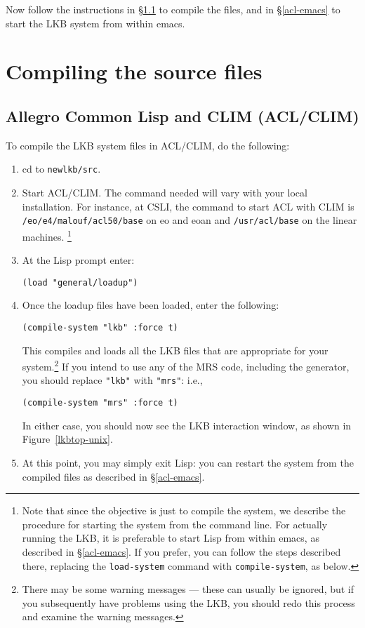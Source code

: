 \documentclass[12pt]{report}
\newcommand{\filename}[1]{{\tt #1}}
\newcommand{\functionname}[1]{{\tt #1}}
\begin{document}
Now follow the instructions in \S\ref{acl-src} to compile the
files, and in \S\ref{acl-emacs} to start the LKB system from within
emacs.


\section{Compiling the source files}
\label{src}

\subsection{Allegro Common Lisp and CLIM (ACL/CLIM)}
\label{acl-src}

To compile the LKB system files in ACL/CLIM, do the following:
\begin{enumerate}
\item cd to \filename{newlkb/src}.  
\item Start ACL/CLIM.  The command needed will vary with your local
installation.  For instance,
at CSLI, the command to start ACL with CLIM is \filename{/eo/e4/malouf/acl50/base} on eo and eoan and
\filename{/usr/acl/base} on the linear machines.
\footnote{Note that since the objective is just to compile the system,
we describe the procedure for
starting the system from the command line.  For actually running the LKB,
it is preferable to start Lisp from within emacs, as described
in \S\ref{acl-emacs}.  If you prefer, you can follow the steps described
there, replacing the \functionname{load-system} command with 
\functionname{compile-system},
as below.}
\item At the Lisp prompt enter:
\begin{verbatim}
(load "general/loadup") 
\end{verbatim}
\item Once the loadup files have been loaded, enter the following:
\begin{verbatim}
(compile-system "lkb" :force t)
\end{verbatim}
This compiles and loads all the LKB files that are appropriate for
your system.\footnote{There may be
some warning messages --- these can usually be ignored, but if you subsequently
have problems using the LKB, you should redo this process
and examine the warning messages.}
If you intend to use any of the MRS code, including the generator,
you should replace \verb+"lkb"+ with \verb+"mrs"+: i.e.,
\begin{verbatim}
(compile-system "mrs" :force t)
\end{verbatim}
In either case, you
should now see the LKB interaction window, as shown in 
Figure~\ref{lkbtop-unix}.
\item At this point, you may simply exit Lisp:
you can restart the system from the compiled files
as described in \S\ref{acl-emacs}.
\end{enumerate}
\end{document}

